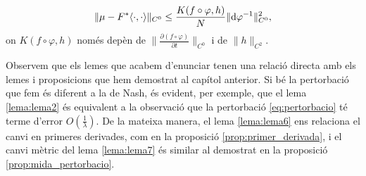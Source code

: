 \begin{lema}
    \label{lema:lema7}
    \begin{equation*}
        \|\mu-F^*\langle\cdot, \cdot\rangle\|_{C^0} \le \frac{K(f\circ\varphi,h)}{N}\|\textrm d\varphi ^{-1}\|_{C^0}^2,
    \end{equation*}
    on $K(f\circ\varphi,h)$ només depèn de $\|\frac{\partial(f\circ\varphi)}{\partial t}\|_{C^0}$ i de $\|h\|_{C^2}$.
\end{lema}

\begin{obs}
    Observem que els lemes que acabem d'enunciar tenen una relació directa amb els lemes i proposicions que hem demostrat al capítol anterior. Si bé la pertorbació que fem és diferent a la de Nash, és evident, per exemple, que el lema \ref{lema:lema2} és equivalent a la observació que la pertorbació \eqref{eq:pertorbacio} té terme d'error $O\left(\frac{1}{\lambda}\right)$. De la mateixa manera, el lema \ref{lema:lema6} ens relaciona el canvi en primeres derivades, com en la proposició \ref{prop:primer_derivada}, i el canvi mètric del lema \ref{lema:lema7} és similar al demostrat en la proposició \ref{prop:mida_pertorbacio}.
\end{obs}


